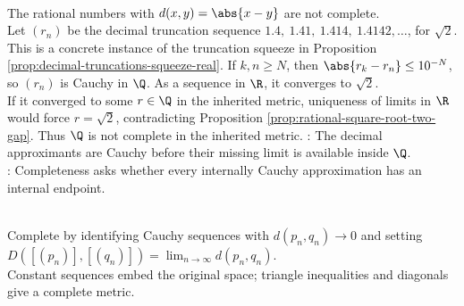 \begin{example} \label{ex:rational-metric-not-complete} \\
The rational numbers with $d(x,y)=\abs{x-y}$ are not complete.\\
Let $(r_n)$ be the decimal truncation sequence $1.4,\ 1.41,\ 1.414,\ 1.4142,\ldots$, for $\sqrt{2}$.\\
This is a concrete instance of the truncation squeeze in Proposition \ref{prop:decimal-truncations-squeeze-real}. If $k,n\geq N$, then $\abs{r_k-r_n}\leq10^{-N}$, so $(r_n)$ is Cauchy in $\Q$. As a sequence in $\R$, it converges to $\sqrt{2}$.\\
If it converged to some $r\in\Q$ in the inherited metric, uniqueness of limits in $\R$ would force $r=\sqrt{2}$, contradicting Proposition \ref{prop:rational-square-root-two-gap}. Thus $\Q$ is not complete in the inherited metric.
: The decimal approximants are Cauchy before their missing limit is available inside $\Q$.\\
: Completeness asks whether every internally Cauchy approximation has an internal endpoint.
\end{example}

\begin{perspective} \label{per:cauchy-completion-skeleton} \\
Complete by identifying Cauchy sequences with $d(p_n,q_n)\to0$ and setting $D([(p_n)],[(q_n)])=\lim_{n\to\infty}d(p_n,q_n)$.\\
Constant sequences embed the original space; triangle inequalities and diagonals give a complete metric.
\end{perspective}


